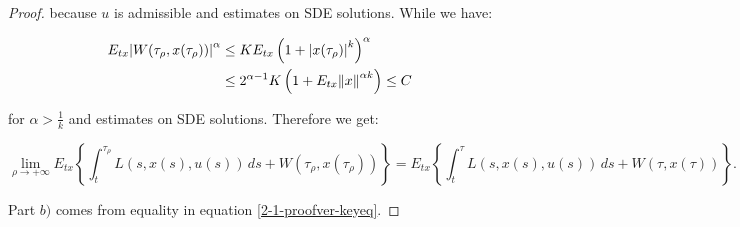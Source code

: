 \begin{theorem}
\begin{proof}
        because $u$ is admissible and estimates on SDE solutions. While we have:

        \begin{align}
            E_{tx}\abs{W(\tau_{\rho},x(\tau_{\rho}))}^{\alpha} & \leq K E_{tx}\left(1+\abs{x(\tau_{\rho})}^k\right)^{\alpha} \\
            & \leq 2^{\alpha-1}K\left(1+E_{tx}\norm{x}^{\alpha k}\right) \leq C
        \end{align}

        for $\alpha>\frac{1}{k}$ and estimates on SDE solutions. Therefore we get:

        \begin{equation}
            \lim_{\rho\to+\infty} E_{tx}\left\{\int_t^{\tau_{\rho}} L(s,x(s),u(s))\,ds + W(\tau_{\rho},x(\tau_{\rho}))\right\} = E_{tx}\left\{\int_t^{\tau} L(s,x(s),u(s))\,ds + W(\tau,x(\tau))\right\}.
        \end{equation}

        Part $b)$ comes from equality in equation \ref{2-1-proofver-keyeq}.
    \end{proof}
\end{theorem}





